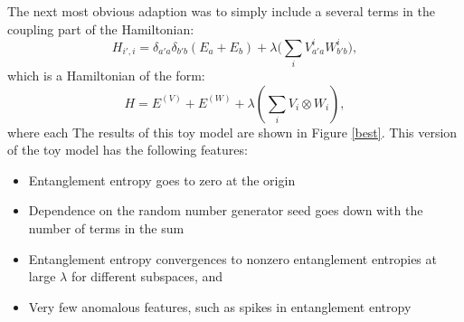The next most obvious 
adaption was to simply include a several terms in the coupling part of the Hamiltonian:
\begin{equation}
    H_{i',i} = \delta_{a'a}\delta_{b'b}(E_a+E_b)+\lambda\big( 
\sum_i V_{a'a}^i W_{b'b}^i  \big ),
\end{equation}
which is a Hamiltonian of the form:
\begin{equation}
    H = E^{(V)} + E^{(W)} + \lambda (\sum_i V_i \otimes W_i ),
\end{equation}
where each 
The results of this toy model are shown in Figure \ref{best}.
This version of the toy model has the following 
features: 
\begin{itemize}[noitemsep]
\item Entanglement entropy goes to zero at the origin
\item Dependence on the random number generator seed goes down
    with the number of terms in the sum
\item Entanglement entropy convergences to nonzero entanglement 
    entropies at large $\lambda$ for different 
subspaces, and 
\item Very few anomalous features, such as spikes in entanglement entropy
\end{itemize}

